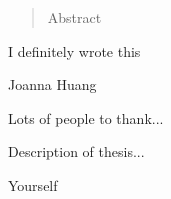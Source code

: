 
\begin{abstract}%
  Abstract
\end{abstract}


\begin{declaration}
  I definitely wrote this
  \vspace*{1cm}
  \begin{flushright}
    Joanna Huang
  \end{flushright}
\end{declaration}


\begin{acknowledgements}
  Lots of people to thank...
\end{acknowledgements}


\begin{preface}
    Description of thesis...

\end{preface}

\tableofcontents

%
  {Yourself}
\thispagestyle{empty}
